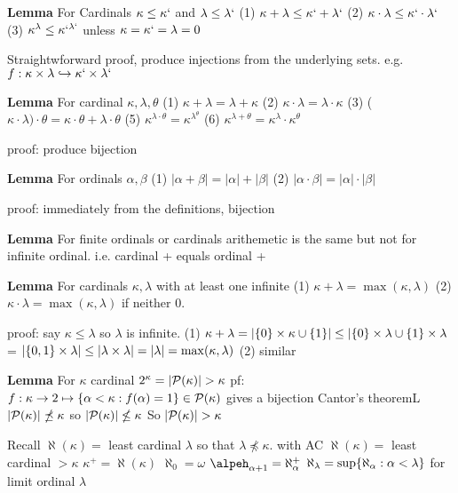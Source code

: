 \textbf{Lemma}
For Cardinals $\kappa \leq \kappa`$ and $\lambda \leq \lambda`$
(1) $\kappa + \lambda \leq \kappa` + \lambda`$
(2) $\kappa \cdot \lambda \leq \kappa` \cdot \lambda`$
(3) $\kappa^\lambda \leq \kappa`^{\lambda`}$ unless $\kappa = \kappa` = \lambda = 0$


    Straightwforward proof, produce injections from the underlying sets.
    e.g. $f : \kappa \times \lambda \hookrightarrow \kappa` \times \lambda`$

\textbf{Lemma}
For cardinal $\kappa, \lambda, \theta$
(1) $\kappa + \lambda = \lambda + \kappa$
(2) $\kappa \cdot \lambda = \lambda \cdot \kappa$
(3) ($\kappa \cdot \lambda) \cdot \theta = \kappa \cdot \theta + \lambda \cdot \theta$
(5) $\kappa^{\lambda \cdot \theta} = \kappa^{\lambda^\theta}$
(6) $\kappa^{\lambda + \theta} = \kappa^\lambda \cdot \kappa^\theta$

proof: produce bijection

\textbf{Lemma}
For ordinals $\alpha, \beta$
(1) $|\alpha + \beta| = |\alpha| + |\beta|$
(2) $|\alpha \cdot \beta| = |\alpha| \cdot |\beta|$

proof: immediately from the definitions, bijection

\textbf{Lemma}
For finite ordinals or cardinals
arithemetic is the same but not for infinite ordinal. i.e. cardinal + equals ordinal +

\textbf{Lemma}
For cardinals $\kappa, \lambda$ with at least one infinite
(1) $\kappa + \lambda = \max(\kappa,\lambda)$
(2) $\kappa \cdot \lambda = \max(\kappa,\lambda)$ if neither 0.

proof: say $\kappa \leq \lambda$ so $\lambda$ is infinite.
(1) $\kappa + \lambda = |\set{0} \times \kappa \cup \set{1} \time \lambda | \leq |\set{0}\times\lambda \cup \set{1} \times \lambda$ = $|\{0,1\}\times \lambda| \leq |\lambda \times \lambda| = |\lambda| = \max(\kappa,\lambda)$
(2) similar

\textbf{Lemma}
For $\kappa$ cardinal
$2^\kappa = |\mathcal{P}(\kappa)| > \kappa$
pf: $f : \kappa \rightarrow 2 \mapsto \{\alpha < \kappa : f(\alpha) = 1\} \in \mathcal{P}(\kappa)$ gives a bijection
Cantor's theoremL $|\mathcal{P}(\kappa)| \npreceq \kappa$ so $|\mathcal{P}(\kappa)| \nleq \kappa$
So $|\mathcal{P}(\kappa)| > \kappa$

Recall $\aleph(\kappa) =$ least cardinal $\lambda$ so that $\lambda \npreceq \kappa$.
with AC $\aleph(\kappa) = $ least cardinal $> \kappa$
$\kappa^+ = \aleph(\kappa)$
$\aleph_0 = \omega$
$\alpeh_{\alpha + 1} = \aleph_\alpha^+$
$\aleph_\lambda = \sup\{\aleph_\alpha : \alpha < \lambda\}$ for limit ordinal $\lambda$

